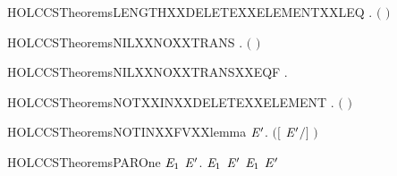\begin{SaveVerbatim}{HOLCCSTheoremsLENGTHXXDELETEXXELEMENTXXLEQ}
\HOLTokenTurnstile{} \HOLSymConst{\HOLTokenForall{}} .  \ensuremath{(}  \ensuremath{)} \HOLSymConst{\HOLTokenLeq{}}  
\end{SaveVerbatim}
\newcommand{\HOLCCSTheoremsLENGTHXXDELETEXXELEMENTXXLEQ}{\UseVerbatim{HOLCCSTheoremsLENGTHXXDELETEXXELEMENTXXLEQ}}
\begin{SaveVerbatim}{HOLCCSTheoremsNILXXNOXXTRANS}
\HOLTokenTurnstile{} \HOLSymConst{\HOLTokenForall{}} . \HOLSymConst{\HOLTokenNeg{}}\ensuremath{(} \HOLTokenTransBegin{}\HOLTokenTransEnd {}\ensuremath{)}
\end{SaveVerbatim}
\newcommand{\HOLCCSTheoremsNILXXNOXXTRANS}{\UseVerbatim{HOLCCSTheoremsNILXXNOXXTRANS}}
\begin{SaveVerbatim}{HOLCCSTheoremsNILXXNOXXTRANSXXEQF}
\HOLTokenTurnstile{} \HOLSymConst{\HOLTokenForall{}} .  \HOLTokenTransBegin{}\HOLTokenTransEnd {} \HOLSymConst{\HOLTokenEquiv{}} 
\end{SaveVerbatim}
\newcommand{\HOLCCSTheoremsNILXXNOXXTRANSXXEQF}{\UseVerbatim{HOLCCSTheoremsNILXXNOXXTRANSXXEQF}}
\begin{SaveVerbatim}{HOLCCSTheoremsNOTXXINXXDELETEXXELEMENT}
\HOLTokenTurnstile{} \HOLSymConst{\HOLTokenForall{}} . \HOLSymConst{\HOLTokenNeg{}}  \ensuremath{(}  \ensuremath{)}
\end{SaveVerbatim}
\newcommand{\HOLCCSTheoremsNOTXXINXXDELETEXXELEMENT}{\UseVerbatim{HOLCCSTheoremsNOTXXINXXDELETEXXELEMENT}}
\begin{SaveVerbatim}{HOLCCSTheoremsNOTINXXFVXXlemma}
\HOLTokenTurnstile{} \HOLSymConst{\HOLTokenForall{}}  \ensuremath{\HOLBoundVar{E}\sp{\prime}}.  \HOLConst{\HOLTokenNotIn{}}  \ensuremath{(}\ensuremath{[}  \ensuremath{\HOLBoundVar{E}\sp{\prime}}\ensuremath{/}\ensuremath{]} \ensuremath{)}
\end{SaveVerbatim}
\newcommand{\HOLCCSTheoremsNOTINXXFVXXlemma}{\UseVerbatim{HOLCCSTheoremsNOTINXXFVXXlemma}}
\begin{SaveVerbatim}{HOLCCSTheoremsPAROne}
\HOLTokenTurnstile{} \HOLSymConst{\HOLTokenForall{}}  \ensuremath{\HOLBoundVar{E}\sb{\mathrm{1}}} \ensuremath{\HOLBoundVar{E}\sp{\prime}}.  \HOLTokenTransBegin{}\HOLTokenTransEnd \ensuremath{\HOLBoundVar{E}\sb{\mathrm{1}}} \HOLSymConst{\HOLTokenImp{}}  \HOLSymConst{\ensuremath{\mid}} \ensuremath{\HOLBoundVar{E}\sp{\prime}} \HOLTokenTransBegin{}\HOLTokenTransEnd \ensuremath{\HOLBoundVar{E}\sb{\mathrm{1}}} \HOLSymConst{\ensuremath{\mid}} \ensuremath{\HOLBoundVar{E}\sp{\prime}}
\end{SaveVerbatim}
